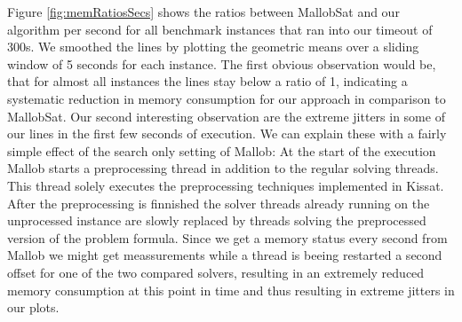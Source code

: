 \documentclass[12pt,a4paper,twoside]{scrartcl}
\numberwithin{equation}{section}
\begin{document}
Figure \ref{fig:memRatiosSecs} shows the ratios between MallobSat and our algorithm per second for all benchmark instances that ran into our timeout of 300s. We smoothed the lines by plotting the geometric means over a sliding window of 5 seconds for each instance. 
The first obvious observation would be, that for almost all instances the lines stay below a ratio of 1, indicating a systematic reduction in memory consumption for our approach in comparison to MallobSat.
Our second interesting observation are the extreme jitters in some of our lines in the first few seconds of execution. We can explain these with a fairly simple effect of the search only setting of Mallob: At the start of the execution Mallob starts a preprocessing thread in addition to the regular solving threads. This thread solely executes the preprocessing techniques implemented in Kissat. After the preprocessing is finnished the solver threads already running on the unprocessed instance are slowly replaced by threads solving the preprocessed version of the problem formula. Since we get a memory status every second from Mallob we might get meassurements while a thread is beeing restarted a second offset for one of the two compared solvers, resulting in an extremely reduced memory consumption at this point in time and thus resulting in extreme jitters in our plots.
\end{document}
